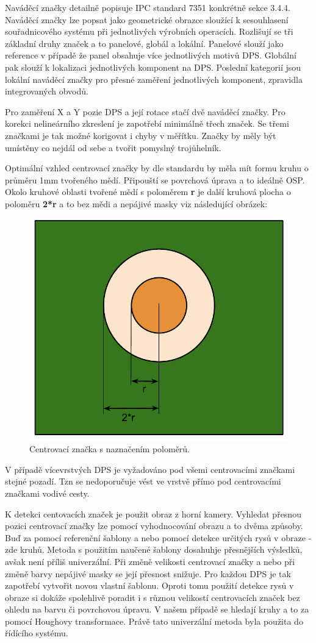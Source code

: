 Naváděcí značky detailně popisuje IPC standard 7351 \cite{ipcFiduc} konkrétně sekce 3.4.4. Naváděcí značky lze popsat jako geometrické obrazce sloužící k sesouhlasení souřadnicového systému při jednotlivých výrobních operacích.
Rozlišují se tři základní druhy značek a to panelové, globál a lokální. Panelové slouží jako reference v případě že panel obsahuje více jednotlivých motivů DPS. Globální pak slouží k lokalizaci jednotlivých komponent na DPS. Poslední kategorií jsou lokální naváděcí značky pro přesné zaměření jednotlivých komponent, zpravidla integrovaných obvodů.

Pro zaměření X a Y pozie DPS a její rotace stačí dvě naváděcí značky. Pro korekci nelineárního zkreslení je zapotřebí minimálně třech značek. Se třemi značkami je tak možné korigovat i chyby v měřítku. Značky by měly být umístěny co nejdál od sebe a tvořit pomyslný trojůhelník. 


Optimální vzhled centrovací značky by dle standardu by měla mít formu kruhu  o průměru 1mm tvořeného mědí. Připouští se povrchová úprava a to ideálně OSP. Okolo kruhové oblasti tvořené mědí s poloměrem \textbf{r} je další kruhová plocha o poloměru \textbf{2*r} a to bez mědi a nepájivé masky viz následující obrázek:

\begin{figure}[H]
  \centering
    \includegraphics[width=0.4\linewidth]{pdf/fiducial2.pdf}%
    \caption{Centrovací značka s naznačením poloměrů.}
    \label{fig:fiducial}
\end{figure}



V případě vícevrstvých DPS je vyžadováno pod všemi centrovacími značkami stejné pozadí. Tzn se nedoporučuje vést ve vrstvě přímo pod centrovacími značkami vodivé cesty.

K detekci centovacích značek je použit obraz z horní kamery. Vyhledat přesnou pozici centrovací značky lze pomocí vyhodnocování obrazu a to dvěma způsoby. Buď za pomocí referenční šablony a nebo pomocí detekce určitých rysů v obraze - zde kruhů.
Metoda s použitím naučené šablony dosahuhje přesnějších výsledků, avšak není příliš univerzální. Při změně velikosti centrovací značky a nebo při změně barvy nepájivé masky se její přesnost snižuje. Pro každou DPS je tak zapotřebí vytvořit novou vlastní šablonu.
Oproti tomu použití detekce rysů v obraze si dokáže spolehlivě poradit i s různou velikostí centrovacích značek bez ohledu na barvu či povrchovou úpravu. V našem případě se hledají kruhy a to za pomocí Houghovy transformace. Právě tato univerzální metoda byla použita do řídícího systému.


